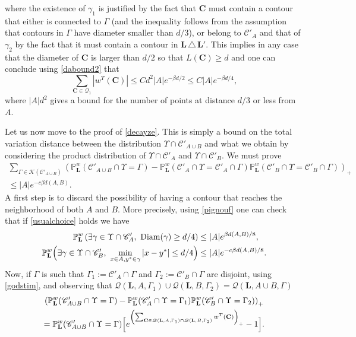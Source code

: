 \documentclass[JEP,XML,SOM,Unicode, NoFloatCountersInSection]{cedram}
\let\mathcal\mathscr
\numberwithin{equation}{section}
\theoremstyle{plain}
\theoremstyle{definition}
\newcommand{\Diam}{\mathrm{Diam}}
\newcommand{\cQ}{{\ensuremath{\mathcal Q}} }
\newcommand{\cC}{{\ensuremath{\mathcal C}} }
\newcommand{\cK}{{\ensuremath{\mathcal K}} }
\newcommand{\bC}{{\ensuremath{\mathbf C}} }
\newcommand{\bL}{{\ensuremath{\mathbf L}} }
\newcommand{\bbP}{{\ensuremath{\mathbb P}} }
\newcommand{\gb}{\beta}
\newcommand{\gG}{\Gamma}
\begin{document}
where the existence of $\gamma_1$ is justified by the fact that $\bC$ must contain a contour that either is connected to $\gG$ (and the inequality follows from
the assumption that contours in $\gG$ have diameter smaller than $d/3$), or belong to $\cC'_A$
and that of $\gamma_2$ by the fact that
it must contain a contour in $\bL\,\triangle\,\bL'$.
This implies in any case that the diameter of $\bC$ is larger than $d/2$ so that $L(\bC)\ge d$ and one can conclude using \eqref{dabound2} that
\begin{equation*}
\sum_{\bC\in \cQ_1} |w^T(\bC)|\le C d^2 |A|e^{-\gb d/2}\le C|A|e^{-\gb d/4},
\end{equation*}
where $|A|d^2$ gives a bound for the number of points at distance $d/3$ or less from $A$.

Let us now move to the proof of \eqref{decayze}.
This is simply a bound on the total variation distance between the distribution $\Upsilon \cap \cC'_{A\cup B}$ and what we obtain by considering the product distribution of $\Upsilon \cap \cC'_A$ and $\Upsilon \cap \cC'_B$. We must prove
\begin{multline*}
\sum_{\gG \in \cK(\cC'_{A\cup B})}\left(\bbP^w_{\bL}(\cC'_{A\cup B} \cap \Upsilon= \gG)- \bbP^w_{\bL}(\cC'_A\cap \Upsilon= \cC'_A\cap \gG)
\bbP^w_{\bL}(\cC'_B\cap \Upsilon=\cC'_B\cap \gG) \right)_+\\[-5pt]
\le |A| e^{-c\gb d(A,B)}.
\end{multline*}
A first step is to discard the possibility of having a contour that reaches the neighborhood of both $A$ and $B$. More precisely, using \eqref{pignouf}
one can check that if \eqref{usualchoice}
holds we have
\begin{equation}\label{badseeds}\begin{split}
\bbP^w_{\bL}\left(\exists \gamma \in \Upsilon \cap \cC'_{A}, \ \Diam(\gamma)\ge d/4 \right)&\le |A| e^{\gb d(A,B)/8},\\
\bbP^w_{\bL}\Bigl(\exists \gamma \in \Upsilon \cap \cC'_{B}, \ \min_{x\in A, y^*\in \gamma}|x-y^*|\le d/4 \Bigr) &\le |A| e^{-c\gb d(A,B)/8}.
\end{split}
\end{equation}
Now, if $\gG$ is such that $ \gG_1:= \cC'_A\cap \gG$ and $\gG_2:=\cC'_B\cap \gG$ are disjoint,
using \eqref{godstim}, and observing that $\cQ(\bL,A,\gG_1)\cup \cQ(\bL,B,\gG_2)= \cQ(\bL,A\cup B,\gG)$
\begin{multline*}
\left(\bbP^w_{\bL}(\cC'_{A\cup B} \cap \Upsilon= \gG)- \bbP^w_{\bL}(\cC'_A\cap \Upsilon= \gG_1)
\bbP^w_{\bL}(\cC'_B\cap \Upsilon=\gG_2) \right)_+
\\= \bbP^w_{\bL}(\cC'_{A\cup B} \cap \Upsilon= \gG)\Bigl[e^{\left(\sum_{\bC\in \cQ(\bL,A,\gG_1)\cap\cQ(\bL,B,\gG_2) } w^T(\bC)\right)_+}-1\Bigr].
\end{multline*}
\end{document}

